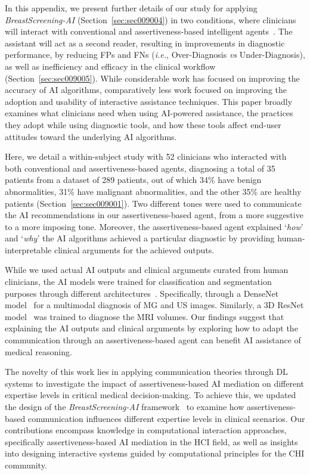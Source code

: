 In this appendix, we present further details of our study for applying {\it BreastScreening-AI} (Section~\ref{sec:sec009004}) in two conditions, where clinicians will interact with conventional and assertiveness-based intelligent agents~\cite{pacheco2019alignment, 10.1145/3311350.3347162}.
The assistant will act as a second reader, resulting in improvements in diagnostic performance, by reducing \acp{FP} and \acp{FN} ({\it i.e.}, Over-Diagnosis {\it vs} Under-Diagnosis), as well as inefficiency and efficacy in the clinical workflow (Section~\ref{sec:sec009005}).
While considerable work has focused on improving the accuracy of \ac{AI} algorithms, comparatively less work focused on improving the adoption and usability of interactive assistance techniques.
This paper broadly examines what clinicians need when using \ac{AI}-powered assistance, the practices they adopt while using diagnostic tools, and how these tools affect end-user attitudes toward the underlying \ac{AI} algorithms.

Here, we detail a within-subject study with 52 clinicians who interacted with both conventional and assertiveness-based agents, diagnosing a total of 35 patients from a dataset of 289 patients, out of which 34\% have benign abnormalities, 31\% have malignant abnormalities, and the other 35\% are healthy patients (Section~\ref{sec:sec009001}).
Two different tones were used to communicate the \ac{AI} recommendations in our assertiveness-based agent, from a more suggestive to a more imposing tone.
Moreover, the assertiveness-based agent explained `{\it how}' and `{\it why}' the \ac{AI} algorithms achieved a particular diagnostic by providing human-interpretable clinical arguments for the achieved outputs.

While we used actual \ac{AI} outputs and clinical arguments curated from human clinicians, the \ac{AI} models were trained for classification and segmentation purposes through different architectures~\cite{HANCER2023321}.
Specifically, through a DenseNet model~\cite{8721151} for a multimodal diagnosis of \ac{MG} and \ac{US} images.
Similarly, a 3D ResNet model~\cite{Aldoj2020} was trained to diagnose the \ac{MRI} volumes.
Our findings suggest that explaining the \ac{AI} outputs and clinical arguments by exploring how to adapt the communication through an assertiveness-based agent can benefit \ac{AI} assistance of medical reasoning.

The novelty of this work lies in applying communication theories through \ac{DL} systems to investigate the impact of assertiveness-based \ac{AI} mediation on different expertise levels in critical medical decision-making.
To achieve this, we updated the design of the {\it BreastScreening-AI} framework~\cite{CALISTO2022102285} to examine how assertiveness-based communication influences different expertise levels in clinical scenarios.
Our contributions encompass knowledge in computational interaction approaches, specifically assertiveness-based \ac{AI} mediation in the \ac{HCI} field, as well as insights into designing interactive systems guided by computational principles for the \acs{CHI} community.

